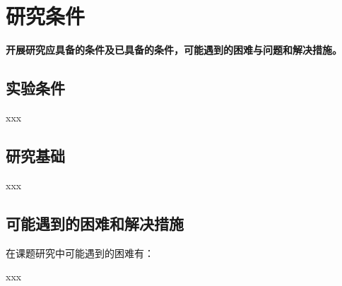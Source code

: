 



\section{研究条件}
\begin{mdframed}[everyline=true]

{\bfseries \kaishu {} 开展研究应具备的条件及已具备的条件，可能遇到的困难与问题和解决措施。}

\subsection{实验条件} 
xxx

\subsection{研究基础}
xxx

\subsection{可能遇到的困难和解决措施}
在课题研究中可能遇到的困难有：

xxx\\[15 cm]
\end{mdframed}

